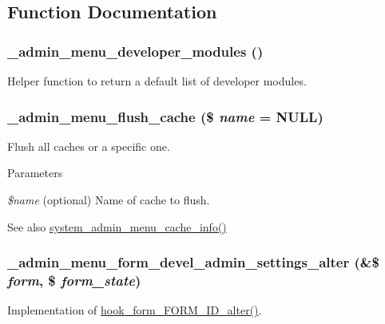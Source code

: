\subsection{Function Documentation}
\hypertarget{admin__menu_8inc_adc75f56f673a11494a4ed92d15e04cdf}{
\subsubsection[{\_\-admin\_\-menu\_\-developer\_\-modules}]{\setlength{\rightskip}{0pt plus 5cm}\_\-admin\_\-menu\_\-developer\_\-modules ()}}
\label{admin__menu_8inc_adc75f56f673a11494a4ed92d15e04cdf}
Helper function to return a default list of developer modules. \hypertarget{admin__menu_8inc_a34a792a4ac923bf39cf8e8f87fb92124}{
\subsubsection[{\_\-admin\_\-menu\_\-flush\_\-cache}]{\setlength{\rightskip}{0pt plus 5cm}\_\-admin\_\-menu\_\-flush\_\-cache (\$ {\em name} = {\ttfamily NULL})}}
\label{admin__menu_8inc_a34a792a4ac923bf39cf8e8f87fb92124}
Flush all caches or a specific one.


\begin{DoxyParams}{Parameters}
\item[{\em \$name}](optional) Name of cache to flush.\end{DoxyParams}
\begin{DoxySeeAlso}{See also}
\hyperlink{admin__menu_8inc_addfcc1ff94f62409d4ff7fa7f523aa45}{system\_\-admin\_\-menu\_\-cache\_\-info()} 
\end{DoxySeeAlso}
\hypertarget{admin__menu_8inc_aa78509bb044821faf77cf6624bd726f8}{
\subsubsection[{\_\-admin\_\-menu\_\-form\_\-devel\_\-admin\_\-settings\_\-alter}]{\setlength{\rightskip}{0pt plus 5cm}\_\-admin\_\-menu\_\-form\_\-devel\_\-admin\_\-settings\_\-alter (\&\$ {\em form}, \/  \$ {\em form\_\-state})}}
\label{admin__menu_8inc_aa78509bb044821faf77cf6624bd726f8}
Implementation of \hyperlink{group__hooks_ga8d4a4089551493d55911bd5c4f218264}{hook\_\-form\_\-FORM\_\-ID\_\-alter()}.

